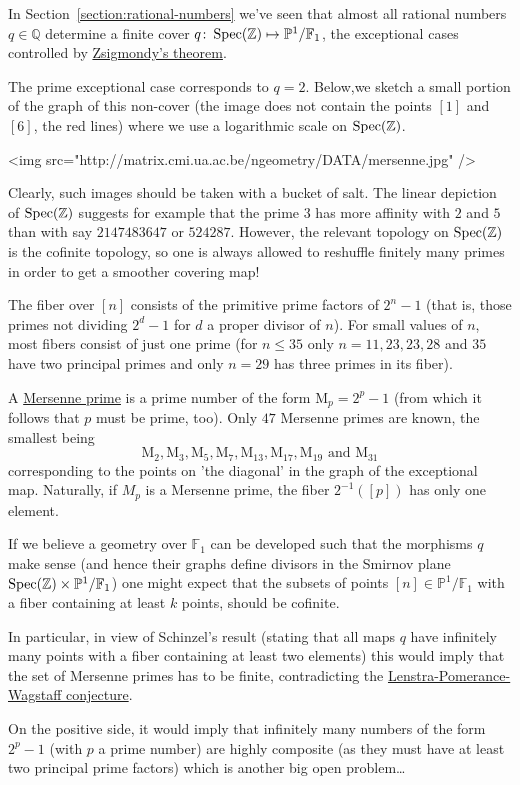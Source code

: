 In Section~\ref{section:rational-numbers} we've seen that almost all rational numbers $q \in \mathbb{Q}$ determine a finite cover $q\colon\operatorname{Spec}(\mathbb{Z}) \mapsto \mathbb{P}^1 / \mathbb{F}_1$, the exceptional cases controlled by \href{http://en.wikipedia.org/wiki/Zsigmondy's_theorem}{Zsigmondy's theorem}.

The prime exceptional case corresponds to $q=2$. Below,we sketch a small portion of the graph of this non-cover (the image does not contain the points $[1]$ and $[6]$, the red lines) where we use a logarithmic scale on $\operatorname{Spec}(\mathbb{Z})$.

<img src="http://matrix.cmi.ua.ac.be/ngeometry/DATA/mersenne.jpg" />

Clearly, such images should be taken with a bucket of salt. The linear depiction of $\operatorname{Spec}(\mathbb{Z})$ suggests for example that the prime $3$ has more affinity with $2$ and $5$ than with say $2147483647$ or $524287$. However, the relevant topology on $\operatorname{Spec}(\mathbb{Z})$ is the cofinite topology, so one is always allowed to reshuffle finitely many primes in order to get a smoother covering  map!

The fiber over $[n]$ consists of the primitive prime factors of $2^n-1$ (that is, those primes not dividing $2^d-1$ for $d$ a proper divisor of $n$). For small values of $n$, most fibers consist of just one prime (for $n \leq 35$ only $n=11,23,23,28$ and $35$ have two principal primes and only $n=29$ has three primes in its fiber).

A \href{http://en.wikipedia.org/wiki/Mersenne_prime}{Mersenne prime} is a prime number of the form $\mathrm{M}_p = 2^p-1$ (from which it follows that $p$ must be prime, too). Only $47$ Mersenne primes are known, the smallest being
\begin{equation}
  \mathrm{M}_2,\mathrm{M}_3,\mathrm{M}_5,\mathrm{M}_7,\mathrm{M}_{13},\mathrm{M}_{17},\mathrm{M}_{19}\text{ and }\mathrm{M}_{31}
\end{equation}
corresponding to the points on 'the diagonal' in the graph of the exceptional map. Naturally, if $M_p$ is a Mersenne prime, the fiber $2^{-1}([p])$ has only one element.

If we believe a geometry over $\mathbb{F}_1$ can be developed such that the morphisms $q$ make sense (and hence their graphs define divisors in the Smirnov plane $\operatorname{Spec}(\mathbb{Z}) \times \mathbb{P}^1 / \mathbb{F}_1$) one might expect that the subsets of points $[n] \in \mathbb{P}^1 / \mathbb{F}_1$ with a fiber containing at least $k$ points, should be cofinite.

In particular, in view of Schinzel's result (stating that all maps $q$ have infinitely many points with a fiber containing at least two elements) this would imply that the set of Mersenne primes has to be finite, contradicting the \href{http://en.wikipedia.org/wiki/Lenstra-Pomerance-Wagstaff_conjecture}{Lenstra-Pomerance-Wagstaff conjecture}.

On the positive side, it would imply that infinitely many numbers of the form $2^p-1$ (with $p$ a prime number) are highly composite (as they must have at least two principal prime factors) which is another big open problem\ldots
